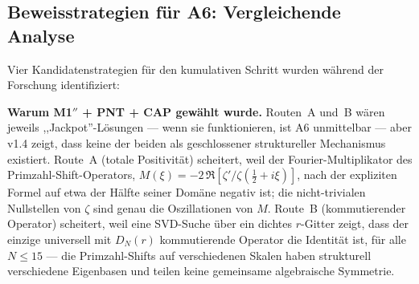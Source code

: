 \documentclass[12pt,a4paper]{article}
\theoremstyle{definition}
\theoremstyle{remark}
\begin{document}
\subsection{Beweisstrategien für A6: Vergleichende Analyse}

Vier Kandidatenstrategien für den kumulativen Schritt wurden während der Forschung identifiziert:

\begin{center}
\footnotesize
\renewcommand{\arraystretch}{1.25}
\end{center}

\noindent\textbf{Warum M1$''$ + PNT + CAP gewählt wurde.} Routen~A und~B wären jeweils ,,Jackpot''-Lösungen --- wenn sie funktionieren, ist A6 unmittelbar --- aber v1.4 zeigt, dass keine der beiden als geschlossener struktureller Mechanismus existiert. Route~A (totale Positivität) scheitert, weil der Fourier-Multiplikator des Primzahl-Shift-Operators, $M(\xi) = -2\,\Re[\zeta'/\zeta(\tfrac{1}{2}+i\xi)]$, nach der expliziten Formel auf etwa der Hälfte seiner Domäne negativ ist; die nicht-trivialen Nullstellen von $\zeta$ sind genau die Oszillationen von $M$. Route~B (kommutierender Operator) scheitert, weil eine SVD-Suche über ein dichtes $r$-Gitter zeigt, dass der einzige universell mit $D_N(r)$ kommutierende Operator die Identität ist, für alle $N \leq 15$ --- die Primzahl-Shifts auf verschiedenen Skalen haben strukturell verschiedene Eigenbasen und teilen keine gemeinsame algebraische Symmetrie.
\end{document}
